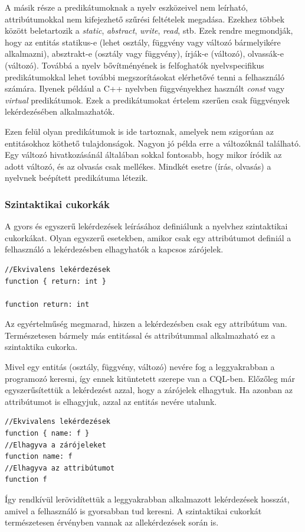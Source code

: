 \documentclass[a4paper,12pt]{report}
\begin{document}
\par A másik része a predikátumoknak a nyelv eszközeivel nem leírható, attribútumokkal nem kifejezhető szűrési feltételek megadása. Ezekhez többek között beletartozik a \textit{static}, \textit{abstract}, \textit{write}, \textit{read}, stb. Ezek rendre megmondják, hogy az entitás statikus-e (lehet osztály, függvény vagy változó bármelyikére alkalmazni), absztrakt-e (osztály vagy függvény), írják-e (változó), olvassák-e (változó). Továbbá a nyelv bővítményének is felfoghatók nyelvspecifikus predikátumokkal lehet további megszorításokat elérhetővé tenni a felhasználó számára. Ilyenek például a C++ nyelvben függvényekhez használt \textit{const} vagy \textit{virtual} predikátumok. Ezek a predikátumokat értelem szerűen csak függvények lekérdezésében alkalmazhatók.
\par Ezen felül olyan predikátumok is ide tartoznak, amelyek nem szigorúan az entitásokhoz köthető tulajdonságok. Nagyon jó példa erre a változóknál található. Egy változó hivatkozásánál általában sokkal fontosabb, hogy mikor íródik az adott változó, és az olvasás csak mellékes. Mindkét esetre (írás, olvasás) a nyelvnek beépített predikátuma létezik.
\subsubsection{Szintaktikai cukorkák}
A gyors és egyszerű lekérdezések leírásához definiálunk a nyelvhez szintaktikai cukorkákat. Olyan egyszerű esetekben, amikor csak egy attribútumot definiál a felhasználó a lekérdezésben elhagyhatók a kapcsos zárójelek.
\begin{verbatim}
//Ekvivalens lekérdezések
function { return: int }

function return: int
\end{verbatim}
\par Az egyértelműség megmarad, hiszen a lekérdezésben csak egy attribútum van. Természetesen bármely más entitással és attribútummal alkalmazható ez a szintaktika cukorka. 
\par Mivel egy entitás (osztály, függvény, változó) nevére fog a leggyakrabban a programozó keresni, így ennek kitüntetett szerepe van a CQL-ben. Előzőleg már egyszerűsítettük a lekérdezést azzal, hogy a zárójelek elhagytuk. Ha azonban az attribútumot is elhagyjuk, azzal az entitás nevére utalunk.
\begin{verbatim}
//Ekvivalens lekérdezések
function { name: f }
//Elhagyva a zárójeleket
function name: f
//Elhagyva az attribútumot
function f
\end{verbatim}
\par Így rendkívül lerövidítettük a leggyakrabban alkalmazott lekérdezések hosszát, amivel a felhasználó is gyorsabban tud keresni. A szintaktikai cukorkát természetesen érvényben vannak az allekérdezések során is.
\end{document}
